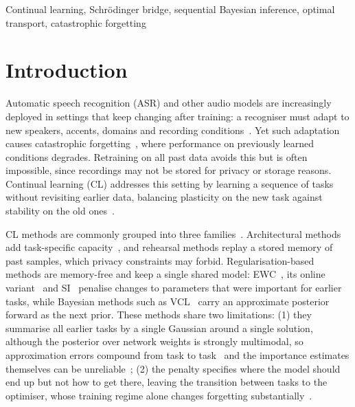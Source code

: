 \documentclass{article}
\newcommand{\tbd}[1]{\textcolor{red}{#1}}
\begin{document}
\begin{keywords}
Continual learning, Schr\"odinger bridge, sequential Bayesian inference,
optimal transport, catastrophic forgetting
\end{keywords}

\section{Introduction}
\label{sec:intro}

%

Automatic speech recognition (ASR) and other audio models are increasingly
deployed in settings that keep changing after training: a recogniser must adapt
to new speakers, accents, domains and recording
conditions~\cite{vandereeckt2023weight,vandereeckt2026inverse}. Yet such
adaptation causes catastrophic
forgetting~\cite{goodfellow2013empirical,kirkpatrick2017ewc}, where performance
on previously learned conditions degrades. Retraining on all past data avoids
this but is often impossible, since recordings may not be stored for privacy or
storage reasons. Continual learning (CL) addresses this setting by learning a
sequence of tasks without revisiting earlier data, balancing plasticity on the
new task against stability on the old
ones~\cite{wang2024survey,mirzadeh2020regimes}.

CL methods are commonly grouped into three
families~\cite{wang2024survey,vandeven2022types}. Architectural methods add
task-specific capacity~\cite{vandereeckt2023adapters}, and rehearsal methods
replay a stored memory of past samples, which privacy constraints may forbid.
Regularisation-based methods are memory-free and keep a single shared model:
EWC~\cite{kirkpatrick2017ewc}, its online variant~\cite{schwarz2018progress} and
SI~\cite{zenke2017si} penalise changes to parameters that were important for
earlier tasks, while Bayesian methods such as VCL~\cite{nguyen2018vcl} carry an
approximate posterior forward as the next prior. These methods share two
limitations: (1) they summarise all earlier tasks by a single Gaussian around a
single solution, although the posterior over network weights is strongly
multimodal, so approximation errors compound from task to
task~\cite{kessler2023sequential,melo2025tdvcl} and the importance estimates
themselves can be unreliable~\cite{liu2026ewcdr}; (2) the penalty specifies
where the model should end up but not how to get there, leaving the transition
between tasks to the optimiser, whose training regime alone changes forgetting
substantially~\cite{mirzadeh2020regimes}.
\end{document}
